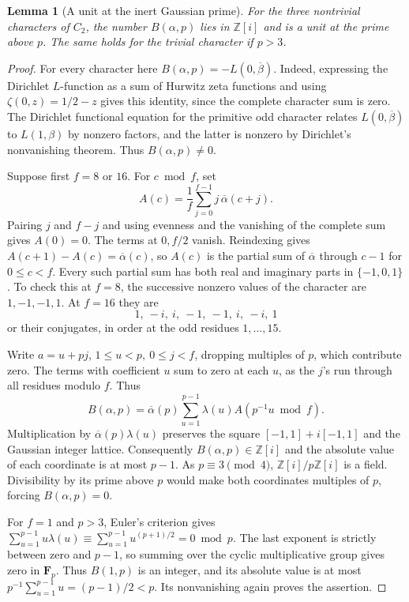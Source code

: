 \documentclass[a4paper,11pt]{article}
\newtheorem{lemma}[proposition]{Lemma}
\theoremstyle{definition}
\theoremstyle{remark}
\newcommand{\ZZ}{\mathbb Z}\newcommand{\ord}{\operatorname{ord}}
\numberwithin{equation}{section}
\begin{document}
\begin{lemma}[A unit at the inert Gaussian prime]\label{lem:bern115}
For the three nontrivial characters of \(C_2\), the number
\(B(\alpha,p)\) lies in \(\ZZ[i]\) and is a unit at the prime
above \(p\). The same holds for the trivial character if \(p>3\).
\end{lemma}
\begin{proof}
For every character here \(B(\alpha,p)=-L(0,\overline\beta)\).
Indeed, expressing the Dirichlet \(L\)-function as a sum of
Hurwitz zeta functions and using \(\zeta(0,z)=1/2-z\) gives
this identity, since the complete character sum is zero. The
Dirichlet functional equation for the primitive odd character
relates \(L(0,\overline\beta)\) to \(L(1,\beta)\) by nonzero
factors, and the latter is nonzero by Dirichlet's nonvanishing
theorem. Thus \(B(\alpha,p)\ne0\).

Suppose first \(f=8\) or \(16\). For \(c\bmod f\), set
\[
 A(c)=\frac1f\sum_{j=0}^{f-1}j\,\overline\alpha(c+j).
\]
Pairing \(j\) and \(f-j\) and using evenness and the vanishing
of the complete sum gives \(A(0)=0\). The terms at \(0,f/2\)
vanish. Reindexing gives \(A(c+1)-A(c)=\overline\alpha(c)\),
so \(A(c)\) is the partial sum of \(\overline\alpha\) through
\(c-1\) for \(0\le c<f\). Every such partial sum has both real
and imaginary parts in \(\{-1,0,1\}\). To check this at
\(f=8\), the successive nonzero values of the character are
\(1,-1,-1,1\). At \(f=16\) they are
\[
       1,\ -i,\ i,\ -1,\ -1,\ i,\ -i,\ 1
\]
or their conjugates, in order at the odd residues \(1,\ldots,15\).

Write \(a=u+pj\), \(1\le u<p,\ 0\le j<f\), dropping multiples
of \(p\), which contribute zero. The terms with coefficient \(u\)
sum to zero at each \(u\), as the \(j\)'s run through all residues
modulo \(f\). Thus
\[
  B(\alpha,p)=\overline\alpha(p)\sum_{u=1}^{p-1}
                  \lambda(u) A(p^{-1}u\bmod f).
\]
Multiplication by \(\overline\alpha(p)\lambda(u)\) preserves the
square \([-1,1]+i[-1,1]\) and the Gaussian integer lattice.
Consequently \(B(\alpha,p)\in\ZZ[i]\) and the absolute value of
each coordinate is at most \(p-1\). As \(p\equiv3\pmod4\),
\(\ZZ[i]/p\ZZ[i]\) is a field. Divisibility by its prime above
\(p\) would make both coordinates multiples of \(p\), forcing
\(B(\alpha,p)=0\).

For \(f=1\) and \(p>3\), Euler's criterion gives
\(\sum_{u=1}^{p-1}u\lambda(u)\equiv\sum_{u=1}^{p-1}
u^{(p+1)/2}=0\bmod p\). The last exponent is strictly between
zero and \(p-1\), so summing over the cyclic multiplicative group
gives zero in \(\mathbf F_p\). Thus \(B(1,p)\) is an integer,
and its absolute value is at most
\(p^{-1}\sum_{u=1}^{p-1}u=(p-1)/2<p\). Its nonvanishing again
proves the assertion.
\end{proof}
\end{document}
